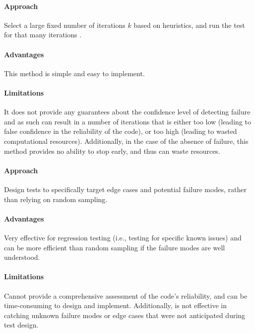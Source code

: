 
        \paragraph{Approach} Select a large fixed number of iterations $k$ based on heuristics, and run the test for that many iterations \cite{myers2011art}.

        \paragraph{Advantages} This method is simple and easy to implement.

        \paragraph{Limitations} It does not provide any guarantees about the confidence level of detecting failure and as such can result in a number of iterations that is either too low (leading to false confidence in the reliability of the code), or too high (leading to wasted computational resources). Additionally, in the case of the absence of failure, this method provides no ability to stop early, and thus can waste resources.


        \paragraph{Approach} Design tests to specifically target edge cases and potential failure modes, rather than relying on random sampling.

        \paragraph{Advantages} Very effective for regression testing (i.e., testing for specific known issues) and can be more efficient than random sampling if the failure modes are well understood.

        \paragraph{Limitations} Cannot provide a comprehensive assessment of the code's reliability, and can be time-consuming to design and implement. Additionally, is not effective in catching unknown failure modes or edge cases that were not anticipated during test design.

